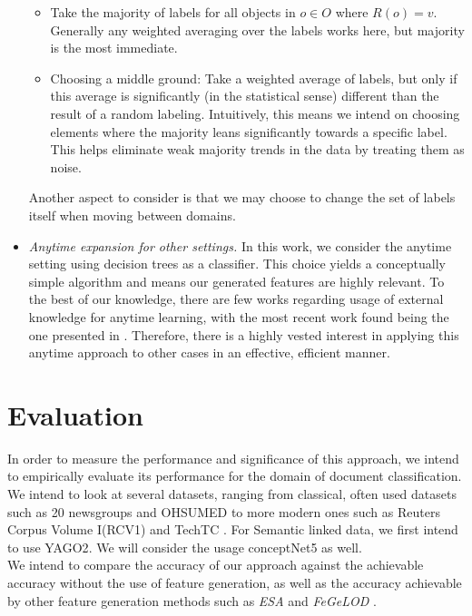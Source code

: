 \documentclass[12pt, a4paper]{article}
\theoremstyle{definition}
\begin{document}
\begin{itemize}
\begin{itemize}
            \item Take the majority of labels for all objects in $o\in O$ where $R(o)=v$. Generally any weighted averaging over the labels works here, but majority is the most immediate.
            \item Choosing a middle ground: Take a weighted average of labels, but only if this average is significantly (in the statistical sense) different than the result of a random labeling. Intuitively, this means we intend on choosing elements where the majority leans significantly towards a specific label. This helps eliminate weak majority trends in the data by treating them as noise.
        \end{itemize}
        Another aspect to consider is that we may choose to change the set of labels itself when moving between domains.
    \item \emph{Anytime expansion for other settings.} In this work, we consider the anytime setting using decision trees as a classifier. This choice yields a conceptually simple algorithm and means our generated features are highly relevant. To the best of our knowledge, there are few works regarding usage of external knowledge for anytime learning, with the most recent work found being the one presented in \citet{lindgren2000anytime}. Therefore, there is a highly vested interest in applying this anytime approach to other cases in an effective, efficient manner.
\end{itemize}

\section{Evaluation}
In order to measure the performance and significance of this approach, we intend to empirically evaluate its performance for the domain of document classification. We intend to look at several datasets, ranging from classical, often used datasets such as 20 newsgroups \citep{Lang95} and OHSUMED \citep{hersh1994ohsumed} to more modern ones such as Reuters Corpus Volume I(RCV1) \citep{lewis2004rcv1} and TechTC \citep{davidov2004parameterized}. For Semantic linked data, we first intend to use YAGO2\citep{hoffart2013yago2}. We will consider the usage conceptNet5 \citep{speer2012representing} as well.\\

We intend to compare the accuracy of our approach against the achievable accuracy without the use of feature generation, as well as the accuracy achievable by other feature generation methods such as \emph{ESA} \citep{gabrilovich2006overcoming} and \emph{FeGeLOD} \citep{paulheim2012unsupervised}.
\end{document}
